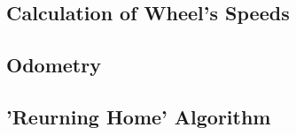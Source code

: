\documentclass[]{article}
\begin{document}
\subsection{Calculation of Wheel's Speeds}

\subsection{Odometry}

\subsection{'Reurning Home' Algorithm}
%
\end{document}
